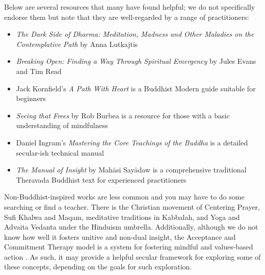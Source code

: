 \documentclass[12pt,letterpaper]{book}
\begin{document}
Below are several resources that many have found helpful; we do not specifically endorse them but note that they are well-regarded by a range of practitioners:
\begin{itemize}
    \item \textit{The Dark Side of Dharma: Meditation, Madness and Other Maladies on the Contemplative Path} by Anna Lutkajtis \cite{lutkajtis2021dark}
    \item \textit{Breaking Open: Finding a Way Through Spiritual Emergency} by Jules Evans and Tim Read \cite{evans2020}
    \item Jack Kornfield's \textit{A Path With Heart} is a Buddhist Modern guide suitable for beginners \cite{kornfield1993path}
    \item \textit{Seeing that Frees} by Rob Burbea is a resource for those with a basic understanding of mindfulness \cite{burbea2014seeing}
    \item Daniel Ingram's \textit{Mastering the Core Teachings of the Buddha} is a detailed secular-ish technical manual \cite{ingram2018mastering}
    \item \textit{The Manual of Insight} by Mahāsī Sayādaw is a comprehensive traditional Theravada Buddhist text for experienced practitioners \cite{sayadaw2016manual}
\end{itemize}
Non-Buddhist-inspired works are less common and you may have to do some searching or find a teacher. There is the Christian movement of Centering Prayer, Sufi Khalwa and Maqam, meditative traditions in Kabbalah, and Yoga and Advaita Vedanta under the Hinduism umbrella. Additionally, although we do not know how well it fosters unitive and non-dual insight, the Acceptance and Commitment Therapy model is a system for fostering mindful and values-based action \cite{actSimple}. As such, it may provide a helpful secular framework for exploring some of these concepts, depending on the goals for such exploration.
\end{document}
